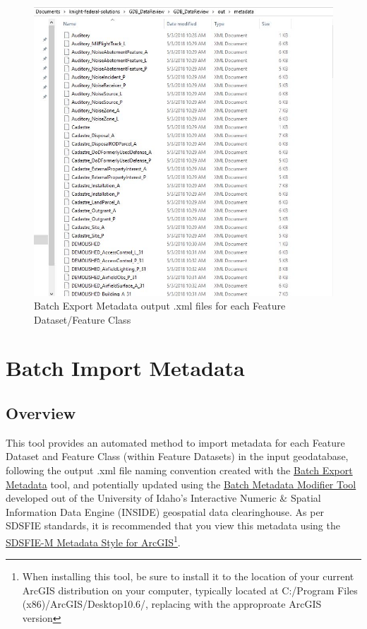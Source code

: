 \documentclass[openany]{book}
\let\rmarkdownfootnote\footnote%
\def\footnote{\protect\rmarkdownfootnote}
\theoremstyle{definition}
\theoremstyle{definition}
\theoremstyle{definition}
\theoremstyle{remark}
\begin{document}
\begin{figure}[H]

{\centering \includegraphics{figures/exMeta-after} 

}

\caption{Batch Export Metadata output .xml files for each Feature Dataset/Feature Class}\label{fig:exMetaafter}
\end{figure}

\hypertarget{imMeta}{\chapter{Batch Import Metadata}\label{imMeta}}

\section{Overview}\label{overview-11}

This tool provides an automated method to import metadata for each
Feature Dataset and Feature Class (within Feature Datasets) in the input
geodatabase, following the output .xml file naming convention created
with the \protect\hyperlink{exMeta}{Batch Export Metadata} tool, and
potentially updated using the
\href{http://insideidaho.org/helpdocs/batch_metadata_modifier_tool.html}{Batch
Metadata Modifier Tool} developed out of the University of Idaho's
Interactive Numeric \& Spatial Information Data Engine (INSIDE)
geospatial data clearinghouse. As per SDSFIE standards, it is
recommended that you view this metadata using the
\href{https://www.sdsfieonline.org/Standards/Metadata}{SDSFIE-M Metadata
Style for ArcGIS}\footnote{When installing this tool, be sure to install
  it to the location of your current ArcGIS distribution on your
  computer, typically located at C:/Program Files
  (x86)/ArcGIS/Desktop10.6/, replacing with the approproate ArcGIS
  version}.
\end{document}
